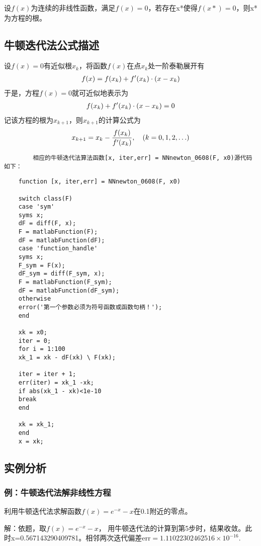 \documentclass[12pt, a4paper, oneside]{ctexart}
\begin{document}
	设$f(x)$为连续的非线性函数，满足$f(x) = 0$，若存在x*使得$f(x*)
=0$，则x*为方程的根。

	\subsection{牛顿迭代法公式描述}
	设$f(x)=0$有近似根$x_k$，将函数$f(x)$在点$x_k$处一阶泰勒展开有
	\begin{align}f(x) = f(x_k) + f'(x_k) \cdot (x - x_k) \notag\end{align}
	于是，方程$f(x)=0$就可近似地表示为\begin{align}f(x_k) + f'(x_k) \cdot (x - x_k) = 0  \notag\end{align}
	记该方程的根为$x_{k+1}$，则$x_{k+1}$的计算公式为\begin{align} x_{k+1} = x_k - \frac{f(x_k)}{f'(x_k)} , \quad (k = 0,1,2,\ldots)\notag\end{align}
	
	\begin{verbatim}
		相应的牛顿迭代法算法函数[x, iter,err] = NNnewton_0608(F, x0)源代码如下：
	\end{verbatim}
	\begin{lstlisting}
	function [x, iter,err] = NNnewton_0608(F, x0)
	
	switch class(F)
	case 'sym'
	syms x;
	dF = diff(F, x);
	F = matlabFunction(F);
	dF = matlabFunction(dF);
	case 'function_handle'
	syms x;
	F_sym = F(x);
	dF_sym = diff(F_sym, x);
	F = matlabFunction(F_sym);
	dF = matlabFunction(dF_sym);
	otherwise
	error('第一个参数必须为符号函数或函数句柄！');
	end
	
	xk = x0;
	iter = 0;
	for i = 1:100
	xk_1 = xk - dF(xk) \ F(xk);
	
	iter = iter + 1;
	err(iter) = xk_1 -xk;
	if abs(xk_1 - xk)<1e-10
	break
	end
	
	xk = xk_1;
	end
	x = xk;
	\end{lstlisting}

\subsection{实例分析}
\subsubsection{例：牛顿迭代法解非线性方程}
利用牛顿迭代法求解函数$f(x) = e^{-x} - x$在0.1附近的零点。


解：依题，取$f(x) = e^{-x}-x$， 用牛顿迭代法的计算到第5步时，结果收敛。此时x=0.567143290409781。相邻两次迭代偏差$\text{err} = 1.11022302462516 \times 10^{-16}$.
\end{document}
